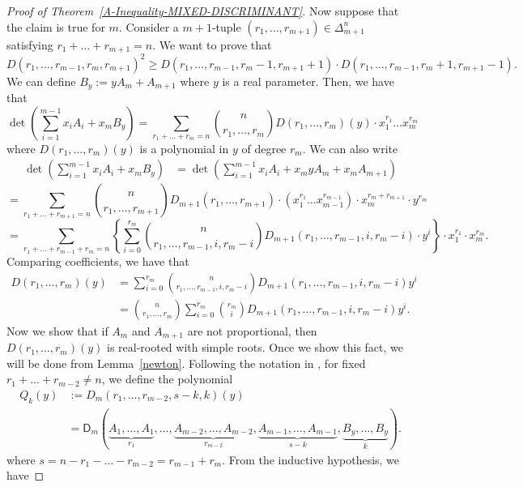 \documentclass{puthesis-UG}
\begin{document}
\begin{proof}[Proof of Theorem~\ref{A-Inequality-MIXED-DISCRIMINANT}]
	Now suppose that the claim is true for $m$. Consider a $m+1$-tuple $(r_1, \ldots, r_{m+1}) \in \Delta_{m+1}^n$ satisfying $r_1 + \ldots + r_{m+1} = n$. We want to prove that 
	\[
		D(r_1, \ldots, r_{m-1}, r_m, r_{m+1})^2 \geq D(r_1, \ldots, r_{m-1}, r_m - 1, r_{m+1}+1) \cdot D(r_1, \ldots, r_{m-1}, r_m+1, r_{m+1}-1).
	\]
	We can define $B_y := y A_m + A_{m+1}$ where $y$ is a real parameter. Then, we have that
	\[
		\det \left ( \sum_{i = 1}^{m-1} x_i A_i + x_m B_y \right ) = \sum_{r_1 + \ldots + r_m = n} \binom{n}{r_1, \ldots, r_m} D(r_1, \ldots, r_m) (y) \cdot x_1^{r_1} \ldots x_m^{r_m}
	\]
	where $D(r_1, \ldots, r_m)(y)$ is a polynomial in $y$ of degree $r_m$. We can also write 
	\begin{align*}
		\det \left ( \sum_{i = 1}^{m-1} x_i A_i + x_m B_y \right ) & = \det \left ( \sum_{i = 1}^{m-1} x_i A_i + x_m y A_m + x_m A_{m+1} \right ) 
	\end{align*}
	\[ = \sum_{r_1 + \ldots + r_{m+1} = n} \binom{n}{r_1, \ldots, r_{m+1}} D_{m+1}(r_1, \ldots, r_{m+1}) \cdot (x_1^{r_1} \ldots x_{m-1}^{r_{m-1}}) \cdot x_m^{r_m + r_{m+1}} \cdot y^{r_m} 
	\]
	\[
	= \sum_{r_1 + \ldots + r_{m-1} + r_m = n} \left \{ \sum_{i = 0}^{r_m} \binom{n}{r_1, \ldots, r_{m-1}, i, r_m - i} D_{m+1}(r_1, \ldots, r_{m-1}, i, r_m - i) \cdot y^i \right \} \cdot x_1^{r_1} \cdot x_m^{r_m}.
	\]
	Comparing coefficients, we have that 
	\begin{align*}
		D(r_1, \ldots, r_m)(y) & = \sum_{i = 0}^{r_m} \binom{n}{r_1, \ldots, r_{m-1}, i, r_m - i} D_{m+1}(r_1, \ldots, r_{m-1},i, r_m-i) y^i \\
		& = \binom{n}{r_1, \ldots, r_m} \sum_{i = 0}^{r_m} \binom{r_m}{i} D_{m+1}(r_1, \ldots, r_{m-1}, i, r_m - i) y^i.
	\end{align*}
	Now we show that if $A_m$ and $A_{m+1}$ are not proportional, then $D(r_1, \ldots, r_m)(y)$ is real-rooted with simple roots. Once we show this fact, we will be done from Lemma~\ref{newton}. Following the notation in \cite{schneider-mixed-discriminants}, for fixed $r_1 + \ldots + r_{m-2} \neq n$, we define the polynomial
	\begin{align*}
		Q_k(y) & := D_m(r_1, \ldots, r_{m-2}, s-k, k) (y) \\
		& = \mathsf{D}_m (\underbrace{A_1, \ldots, A_1}_{r_1}, \ldots, \underbrace{A_{m-2}, \ldots, A_{m-2}}_{r_{m-2}}, \underbrace{A_{m-1}, \ldots, A_{m-1}}_{s-k}, \underbrace{B_y, \ldots, B_y}_k).
	\end{align*}
	where $s = n - r_1 - \ldots - r_{m-2} = r_{m-1} + r_m$. From the inductive hypothesis, we have 

\end{proof}
\end{document}
